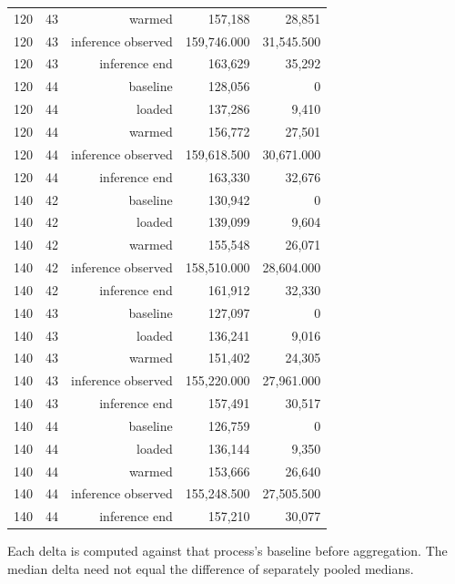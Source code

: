 \documentclass[10pt,a4paper]{article}
\begin{document}
\begin{longtable}{@{}lrrrr@{}}
120 & 43 & warmed & 157,188 & 28,851 \\
120 & 43 & inference observed & 159,746.000 & 31,545.500 \\
120 & 43 & inference end & 163,629 & 35,292 \\
120 & 44 & baseline & 128,056 & 0 \\
120 & 44 & loaded & 137,286 & 9,410 \\
120 & 44 & warmed & 156,772 & 27,501 \\
120 & 44 & inference observed & 159,618.500 & 30,671.000 \\
120 & 44 & inference end & 163,330 & 32,676 \\
140 & 42 & baseline & 130,942 & 0 \\
140 & 42 & loaded & 139,099 & 9,604 \\
140 & 42 & warmed & 155,548 & 26,071 \\
140 & 42 & inference observed & 158,510.000 & 28,604.000 \\
140 & 42 & inference end & 161,912 & 32,330 \\
140 & 43 & baseline & 127,097 & 0 \\
140 & 43 & loaded & 136,241 & 9,016 \\
140 & 43 & warmed & 151,402 & 24,305 \\
140 & 43 & inference observed & 155,220.000 & 27,961.000 \\
140 & 43 & inference end & 157,491 & 30,517 \\
140 & 44 & baseline & 126,759 & 0 \\
140 & 44 & loaded & 136,144 & 9,350 \\
140 & 44 & warmed & 153,666 & 26,640 \\
140 & 44 & inference observed & 155,248.500 & 27,505.500 \\
140 & 44 & inference end & 157,210 & 30,077 \\
\end{longtable}\endgroup
\noindent\small Each delta is computed against that process's baseline before aggregation. The median delta need not equal the difference of separately pooled medians.\normalsize\par\medskip
\begingroup\small\setlength{\tabcolsep}{4pt}\renewcommand{\arraystretch}{1.12}
\end{document}
